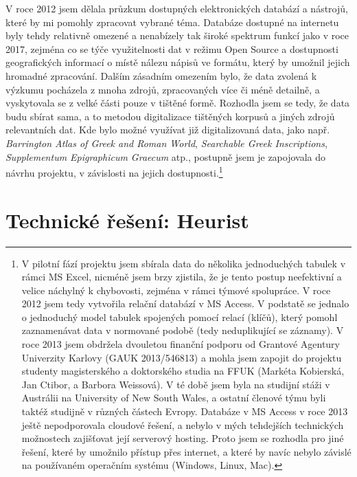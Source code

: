 V roce 2012 jsem dělala průzkum dostupných elektronických databází a nástrojů, které by mi pomohly zpracovat vybrané téma. Databáze dostupné na internetu byly tehdy relativně omezené a nenabízely tak široké spektrum funkcí jako v roce 2017, zejména co se týče využitelnosti dat v režimu Open Source a dostupnosti geografických informací o místě nálezu nápisů ve formátu, který by umožnil jejich hromadné zpracování. Dalším zásadním omezením bylo, že data zvolená k výzkumu pocházela z mnoha zdrojů, zpracovaných více či méně detailně, a vyskytovala se z velké části pouze v tištěné formě. Rozhodla jsem se tedy, že data budu sbírat sama, a to metodou digitalizace tištěných korpusů a jiných zdrojů relevantních dat. Kde bylo možné využívat již digitalizovaná data, jako např. {\em Barrington Atlas of Greek and Roman World}, {\em Searchable Greek Inscriptions}, {\em Supplementum Epigraphicum Graecum} atp., postupně jsem je zapojovala do návrhu projektu, v závislosti na jejich dostupnosti.\footnote{V pilotní fází projektu jsem sbírala data do několika jednoduchých tabulek v rámci MS Excel, nicméně jsem brzy zjistila, že je tento postup neefektivní a velice náchylný k chybovosti, zejména v rámci týmové spolupráce. V roce 2012 jsem tedy vytvořila relační databází v MS Access. V podstatě se jednalo o jednoduchý model tabulek spojených pomocí relací (klíčů), který pomohl zaznamenávat data v normované podobě (tedy neduplikující se záznamy). V roce 2013 jsem obdržela dvouletou finanční podporu od Grantové Agentury Univerzity Karlovy (GAUK 2013/546813) a mohla jsem zapojit do projektu studenty magisterského a doktorského studia na FFUK (Markéta Kobierská, Jan Ctibor, a Barbora Weissová). V té době jsem byla na studijní stáži v Austrálii na University of New South Wales, a ostatní členové týmu byli taktéž studijně v různých částech Evropy. Databáze v MS Access v roce 2013 ještě nepodporovala cloudové řešení, a nebylo v mých tehdejších technických možnostech zajišťovat její serverový hosting. Proto jsem se rozhodla pro jiné řešení, které by umožnilo přístup přes internet, a které by navíc nebylo závislé na používaném operačním systému (Windows, Linux, Mac).}

\section[technické-řešení-heurist]{Technické řešení: Heurist}

